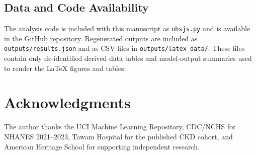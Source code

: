 \documentclass[12pt]{article}
\begin{document}
\subsection{Data and Code Availability}
The analysis code is included with this manuscript as \texttt{nhsjs.py} and is available in the \href{https://github.com/jxia2027-cloud/NHSJS.git}{GitHub repository}. Regenerated outputs are included as \texttt{outputs/results.json} and as CSV files in \texttt{outputs/latex\_data/}. These files contain only de-identified derived data tables and model-output summaries used to render the LaTeX figures and tables.

\section{Acknowledgments}
The author thanks the UCI Machine Learning Repository, CDC/NCHS for NHANES 2021--2023, Tawam Hospital for the published CKD cohort, and American Heritage School for supporting independent research.
\end{document}
